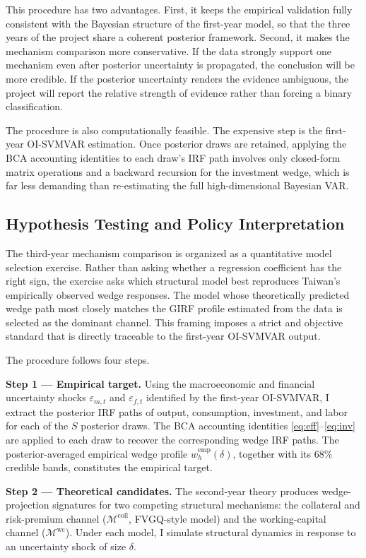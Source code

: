 \documentclass[12pt]{article}
\begin{document}
This procedure has two advantages. First, it keeps the empirical validation fully consistent
with the Bayesian structure of the first-year model, so that the three years of the project
share a coherent posterior framework. Second, it makes the mechanism comparison more
conservative. If the data strongly support one mechanism even after posterior uncertainty is
propagated, the conclusion will be more credible. If the posterior uncertainty renders the
evidence ambiguous, the project will report the relative strength of evidence rather than
forcing a binary classification.

The procedure is also computationally feasible. The expensive step is the first-year OI-SVMVAR
estimation. Once posterior draws are retained, applying the BCA accounting identities to each
draw's IRF path involves only closed-form matrix operations and a backward recursion for the
investment wedge, which is far less demanding than re-estimating the full high-dimensional
Bayesian VAR.

\subsection{Hypothesis Testing and Policy Interpretation}

The third-year mechanism comparison is organized as a quantitative model selection exercise.
Rather than asking whether a regression coefficient has the right sign, the exercise asks which
structural model best reproduces Taiwan's empirically observed wedge responses. The model
whose theoretically predicted wedge path most closely matches the GIRF profile estimated from
the data is selected as the dominant channel. This framing imposes a strict and objective
standard that is directly traceable to the first-year OI-SVMVAR output.

The procedure follows four steps.

\textbf{Step 1 --- Empirical target.}
Using the macroeconomic and financial uncertainty shocks $\varepsilon_{m,t}$ and
$\varepsilon_{f,t}$ identified by the first-year OI-SVMVAR, I extract the posterior IRF paths
of output, consumption, investment, and labor for each of the $S$ posterior draws. The BCA
accounting identities \eqref{eq:eff}--\eqref{eq:inv} are applied to each draw to recover the
corresponding wedge IRF paths. The posterior-averaged empirical wedge profile
$\hat{w}_{h}^{\mathrm{emp}}(\delta)$, together with its 68\% credible bands, constitutes the
empirical target.

\textbf{Step 2 --- Theoretical candidates.}
The second-year theory produces wedge-projection signatures for two competing structural
mechanisms: the collateral and risk-premium channel
($\mathcal{M}^{\mathrm{coll}}$, FVGQ-style model) and the working-capital channel
($\mathcal{M}^{\mathrm{wc}}$). Under each model, I simulate structural dynamics in response
to an uncertainty shock of size $\delta$.
\end{document}
